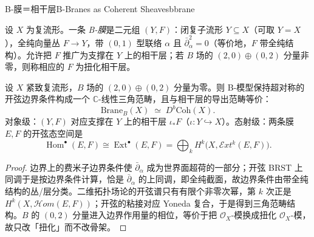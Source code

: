 \begin{centry}{B-膜＝相干层}{B-Branes as Coherent Sheaves}{bbrane}

\begin{definition}[B-膜]
设 $X$ 为复流形。一条 \emph{B-膜}是二元组 $(Y,F)$：闭复子流形 $Y\subseteq X$（可取 $Y=X$），全纯向量丛 $F\to Y$，带 $(0,1)$ 型联络 $\alpha$ 且 $\bar\partial_\alpha^2=0$（等价地，$F$ 带全纯结构）。允许把 $F$ 推广为支撑在 $Y$ 上的相干层；若 $B$ 场的 $(2,0)\oplus(0,2)$ 分量非零，则称相应的 $F$ 为扭化相干层。
\end{definition}

\begin{theorem}
设 $X$ 紧致复流形，$B$ 场的 $(2,0)\oplus(0,2)$ 分量为零。则 B-模型保持超对称的开弦边界条件构成一个 $\mathbb{C}$-线性三角范畴，且与相干层的导出范畴等价：
\[
\mathrm{Brane}_B(X)\;\simeq\;D^b\mathrm{Coh}(X).
\]
对象级：$(Y,F)$ 对应支撑在 $Y$ 上的相干层 $\iota_*F$（$\iota:Y\hookrightarrow X$）。态射级：两条膜 $E,F$ 的开弦态空间是
\[
\operatorname{Hom}^{\bullet}(E,F)\cong\operatorname{Ext}^{\bullet}(E,F)
=\bigoplus_k H^k\bigl(X,\mathcal{E}xt^k(E,F)\bigr).
\]
\end{theorem}
\begin{proof}
边界上的费米子边界条件使 $\bar\partial_\alpha$ 成为世界面超荷的一部分；开弦 BRST 上同调于是按边界条件计算，恰是 $\bar\partial_\alpha$ 的上同调，即全纯截面，故边界条件由带全纯结构的丛/层分类。二维拓扑场论的开弦谱只有有限个非零次幂，第 $k$ 次正是 $H^k(X,\mathcal{H}om(E,F))$；开弦的粘接对应 Yoneda 复合，于是得到三角范畴结构。$B$ 的 $(0,2)$ 分量进入边界作用量的相位，等价于把 $\mathcal{O}_X$-模换成扭化 $\mathcal{O}_X$-模，故只改「扭化」而不改骨架。
\end{proof}


\end{centry}
